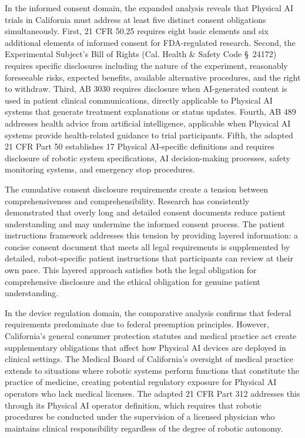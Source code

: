 In the informed consent domain, the expanded analysis reveals that Physical
AI trials in California must address at least five distinct consent
obligations simultaneously. First, 21 CFR 50.25 requires eight basic
elements and six additional elements of informed consent for FDA-regulated
research. Second, the Experimental Subject's Bill of Rights (Cal. Health \&
Safety Code \S~24172) requires specific disclosures including the nature of
the experiment, reasonably foreseeable risks, expected benefits, available
alternative procedures, and the right to withdraw. Third, AB 3030 requires
disclosure when AI-generated content is used in patient clinical
communications, directly applicable to Physical AI systems that generate
treatment explanations or status updates. Fourth, AB 489 addresses health
advice from artificial intelligence, applicable when Physical AI systems
provide health-related guidance to trial participants. Fifth, the adapted
21 CFR Part 50 \cite{cfr50-adapt} establishes 17 Physical AI-specific
definitions and requires disclosure of robotic system specifications, AI
decision-making processes, safety monitoring systems, and emergency stop
procedures.

The cumulative consent disclosure requirements create a tension between
comprehensiveness and comprehensibility. Research has consistently
demonstrated that overly long and detailed consent documents reduce patient
understanding and may undermine the informed consent process. The patient
instructions framework \cite{patient-instructions-paper} addresses this
tension by providing layered information: a concise consent document that
meets all legal requirements is supplemented by detailed, robot-specific
patient instructions that participants can review at their own pace. This
layered approach satisfies both the legal obligation for comprehensive
disclosure and the ethical obligation for genuine patient understanding.

In the device regulation domain, the comparative analysis confirms that
federal requirements predominate due to federal preemption principles.
However, California's general consumer protection statutes and medical
practice act create supplementary obligations that affect how Physical AI
devices are deployed in clinical settings. The Medical Board of
California's oversight of medical practice extends to situations where
robotic systems perform functions that constitute the practice of medicine,
creating potential regulatory exposure for Physical AI operators who lack
medical licenses. The adapted 21 CFR Part 312 \cite{cfr312-adapt} addresses
this through its Physical AI operator definition, which requires that
robotic procedures be conducted under the supervision of a licensed physician
who maintains clinical responsibility regardless of the degree of robotic
autonomy.

